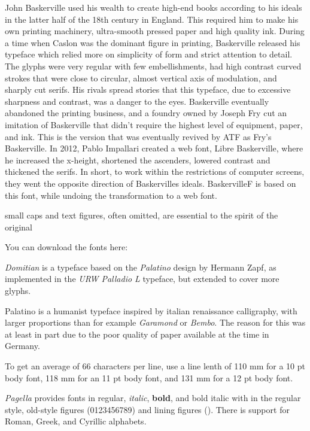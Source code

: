 John Baskerville used his wealth to create high-end books according to his ideals in the latter half of the 18th century in England. This required him to make his own printing machinery, ultra-smooth pressed paper and high quality ink. During a time when Caslon was the dominant figure in printing, Baskerville released his typeface which relied more on simplicity of form and strict attention to detail. The glyphs were very regular with few embellishments, had high contrast curved strokes that were close to circular, almost vertical axis of modulation, and sharply cut serifs. His rivals spread stories that this typeface, due to excessive sharpness and contrast, was a danger to the eyes. Baskerville eventually abandoned the printing business, and a foundry owned by Joseph Fry cut an imitation of Baskerville that didn't require the highest level of equipment, paper, and ink. This is the version that was eventually revived by ATF as Fry's Baskerville. In 2012, Pablo Impallari created a web font, Libre Baskerville, where he increased the x-height, shortened the ascenders, lowered contrast and thickened the serifs. In short, to work within the restrictions of computer screens, they went the opposite direction of Baskervilles ideals. BaskervilleF is based on this font, while undoing the transformation to a web font.

small caps and text figures,
often omitted, are essential to the spirit of the original

You can download the fonts here:  

%
%

{\it Domitian} is a typeface based on the {\it Palatino} design by Hermann Zapf, as implemented in the {\it URW Palladio L} typeface, but extended to cover more glyphs.

Palatino is a humanist typeface inspired by italian renaissance calligraphy, with larger proportions than for example {\it Garamond} or {\it Bembo}. The reason for this was at least in part due to the poor quality of paper available at the time in Germany.

To get an average of 66 characters per line, use a line lenth of 110 mm for a 10 pt body font, 118 mm for an 11 pt body font, and 131 mm for a 12 pt body font.

{\it Pagella} provides fonts in regular, {\it italic}, {\bf bold}, and {\bi bold italic} with  \hairspace in the regular style, old-style figures (0123456789) and lining figures ({}). There is support for Roman, Greek, and Cyrillic alphabets.

%
%



%
%



